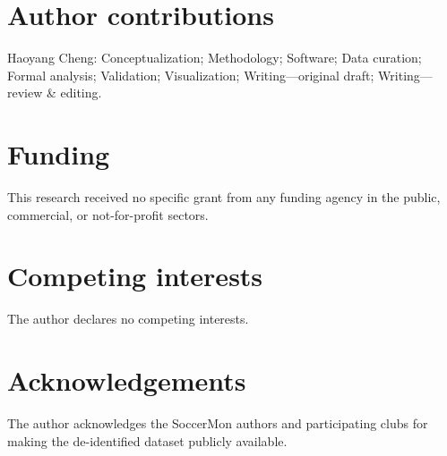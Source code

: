\section*{Author contributions}
Haoyang Cheng: Conceptualization; Methodology; Software; Data curation; Formal analysis; Validation; Visualization; Writing---original draft; Writing---review \& editing.

\section*{Funding}
This research received no specific grant from any funding agency in the public, commercial, or not-for-profit sectors.

\section*{Competing interests}
The author declares no competing interests.

\section*{Acknowledgements}
The author acknowledges the SoccerMon authors and participating clubs for making the de-identified dataset publicly available.
